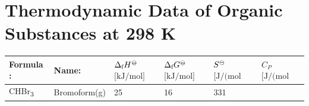 \documentclass[
]{book}
\theoremstyle{definition}
\theoremstyle{definition}
\theoremstyle{definition}
\theoremstyle{remark}
\begin{document}
\hypertarget{thermodynamic-data-of-organic-substances-at-298-k}{%
\section{Thermodynamic Data of Organic Substances at 298 K}\label{thermodynamic-data-of-organic-substances-at-298-k}}

\begin{longtable}[]{@{}llllll@{}}
\toprule
\begin{minipage}[b]{0.07\columnwidth}\raggedright
Formula :\strut
\end{minipage} & \begin{minipage}[b]{0.17\columnwidth}\raggedright
Name:\strut
\end{minipage} & \begin{minipage}[b]{0.15\columnwidth}\raggedright
\(\Delta_{\text{f}} H^{-\kern-6pt{\ominus}\kern-6pt-}\)
\(\scriptstyle{\text{[kJ/mol]}}\)\strut
\end{minipage} & \begin{minipage}[b]{0.15\columnwidth}\raggedright
\(\Delta_{\text{f}} G^{-\kern-6pt{\ominus}\kern-6pt-}\)
\(\scriptstyle{\text{[kJ/mol]}}\)\strut
\end{minipage} & \begin{minipage}[b]{0.14\columnwidth}\raggedright
\(S^{-\kern-6pt{\ominus}\kern-6pt-}\)
\(\scriptstyle{\text{[J/(mol K)]}}\)\strut
\end{minipage} & \begin{minipage}[b]{0.14\columnwidth}\raggedright
\(C_P\)
\(\scriptstyle{\text{[J/(mol K)]}}\)\strut
\end{minipage}\tabularnewline
\midrule
\endhead
\begin{minipage}[t]{0.07\columnwidth}\raggedright
CHBr\textsubscript{3}\strut
\end{minipage} & \begin{minipage}[t]{0.17\columnwidth}\raggedright
Bromoform(g)\strut
\end{minipage} & \begin{minipage}[t]{0.15\columnwidth}\raggedright
25\strut
\end{minipage} & \begin{minipage}[t]{0.15\columnwidth}\raggedright
16\strut
\end{minipage} & \begin{minipage}[t]{0.14\columnwidth}\raggedright
331\strut
\end{minipage} & \begin{minipage}[t]{0.14\columnwidth}\raggedright

\end{minipage}
\end{longtable}
\end{document}
